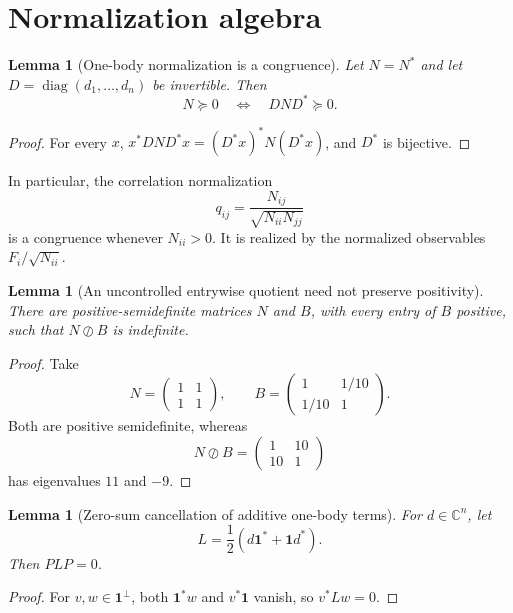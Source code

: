 \documentclass[11pt]{article}
\newtheorem{lemma}[theorem]{Lemma}
\newcommand{\one}{\mathbf 1}
\newcommand{\C}{\mathbb C}
\newcommand{\diag}{\operatorname{diag}}
\newcommand{\odiv}{\oslash}
\begin{document}
\appendix

\section{Normalization algebra}
\label{app:normalization}

\begin{lemma}[One-body normalization is a congruence]
Let $N=N^*$ and let $D=\diag(d_1,\ldots,d_n)$ be invertible.  Then
\[
  N\succeq0
  \quad\Longleftrightarrow\quad
  DND^*\succeq0.
\]
\end{lemma}

\begin{proof}
For every $x$, $x^*DND^*x=(D^*x)^*N(D^*x)$, and $D^*$ is bijective.
\end{proof}

In particular, the correlation normalization
\[
  q_{ij}=\frac{N_{ij}}{\sqrt{N_{ii}N_{jj}}}
\]
is a congruence whenever $N_{ii}>0$.  It is realized by the normalized observables $F_i/\sqrt{N_{ii}}$.

\begin{lemma}[An uncontrolled entrywise quotient need not preserve positivity]
There are positive-semidefinite matrices $N$ and $B$, with every entry of $B$ positive, such that $N\odiv B$ is indefinite.
\end{lemma}

\begin{proof}
Take
\[
  N=\begin{pmatrix}1&1\\1&1\end{pmatrix},
  \qquad
  B=\begin{pmatrix}1&1/10\\1/10&1\end{pmatrix}.
\]
Both are positive semidefinite, whereas
\[
  N\odiv B=\begin{pmatrix}1&10\\10&1\end{pmatrix}
\]
has eigenvalues $11$ and $-9$.
\end{proof}

\begin{lemma}[Zero-sum cancellation of additive one-body terms]
For $d\in\C^n$, let
\[
  L=\frac12(d\one^*+\one d^*).
\]
Then $PLP=0$.
\end{lemma}

\begin{proof}
For $v,w\in\one^\perp$, both $\one^*w$ and $v^*\one$ vanish, so $v^*Lw=0$.
\end{proof}
\end{document}
